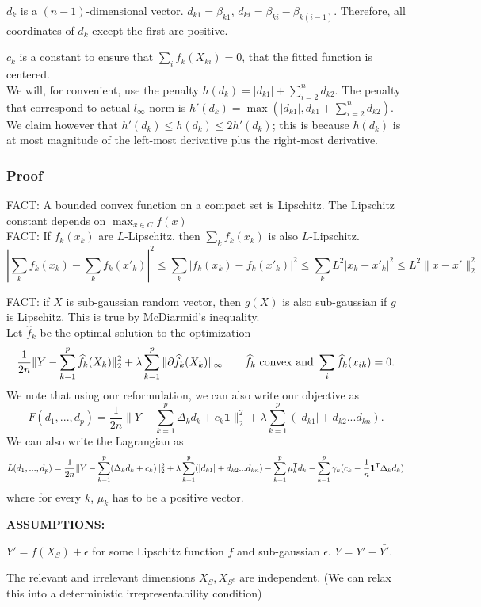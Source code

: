 \documentclass{article}
\begin{document}
$d_k$ is a $(n-1)$-dimensional vector. $d_{k1} = \beta_{k1}$, $d_{ki} = \beta_{ki} - \beta_{k (i-1)}$. Therefore, all coordinates of $d_k$ except the first are positive. 

$c_k$ is a constant to ensure that $\sum_i f_k(X_{ki}) = 0$, that the fitted function is centered.\\

We will, for convenient, use the penalty $h(d_k) = |d_{k1}| + \sum_{i=2}^n d_{k2}$. The penalty that correspond to actual $l_\infty$ norm is $h'(d_k) = \max( |d_{k1}|, d_{k1} + \sum_{i=2}^n d_{k2})$. We claim however that $h'(d_k) \leq h(d_k) \leq 2h'(d_k)$; this is because $h(d_k)$ is at most magnitude of the left-most derivative plus the right-most derivative.

\subsubsection{Proof}

FACT: A bounded convex function on a compact set is Lipschitz. The Lipschitz constant depends on $\max_{x \in C} f(x)$\\

FACT: If $f_k(x_k)$ are $L$-Lipschitz, then $\sum_k f_k(x_k)$ is also $L$-Lipschitz.
\[
| \sum_k f_k(x_k) - \sum_k f_k(x'_k) |^2 \leq \sum_k |f_k(x_k) - f_k(x'_k)|^2 \leq \sum_k L^2| x_k - x'_k |^2 \leq L^2 \| x - x' \|_2^2
\]

FACT: if $X$ is sub-gaussian random vector, then $g(X)$ is also sub-gaussian if $g$ is Lipschitz. This is true by McDiarmid's inequality.\\


Let $\hat{f}_k$ be the optimal solution to the optimization
\[
\frac{1}{2n} \| Y - \sum_{k=1}^p \widehat{f}_k(X_k) \|_2^2 + \lambda\sum_{k=1}^p \| \partial \widehat{f}_k(X_k)\|_\infty \qquad \widehat{f}_k \textrm{ convex and } \sum_i \widehat{f}_k (x_{ik}) = 0 .
\]
We note that using our reformulation, we can also write our objective as
\[
F(d_1,..., d_p) = \frac{1}{2n} \| Y - \sum_{k=1}^p \Delta_k d_k + c_k \mathbf{1} \|_2^2 + \lambda \sum_{k=1}^p ( |d_{k1}| + d_{k2} ... d_{kn} ) .
\]
We can also write the Lagrangian as 
\[
L(d_1,..., d_p) = \frac{1}{2n} \| Y - \sum_{k=1}^p (\Delta_k d_k + c_k )\|_2^2 + \lambda \sum_{k=1}^p ( |d_{k1}| + d_{k2} ... d_{kn} )  - \sum_{k=1}^p \mu_k^{\mathsf{T}} d_k - \sum_{k=1}^p \gamma_k (c_k - \frac{1}{n} \mathbf{1}^{\mathsf{T}} \Delta_k d_k)
\]
where for every $k$, $\mu_k$ has to be a positive vector.

\textbf{ASSUMPTIONS: }
\begin{packed_enum}
\item $Y' = f(X_S) + \epsilon$ for some Lipschitz function $f$ and sub-gaussian $\epsilon$. $Y = Y' - \bar{Y'}$.
\item The relevant and irrelevant dimensions $X_S, X_{S^c}$ are independent. (We can relax this into a deterministic irrepresentability condition)
\end{packed_enum}
\end{document}
